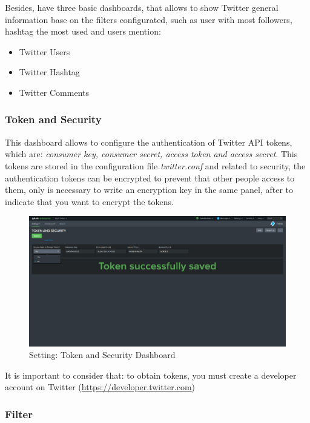 \documentclass[report]{article}
\begin{document}
Besides, have three basic dashboards, that allows to show Twitter general information base on the filters configurated, such as user with most followers, hashtag the most used and users mention: 
\newline
\begin{itemize}
\item Twitter Users
\item Twitter Hashtag
\item Twitter Comments
\newline
\end{itemize}

\subsubsection{Token and Security}
This dashboard allows to configure the authentication of Twitter API tokens, which are: \textit{consumer key, consumer secret, access token and access secret}. This tokens are stored in the configuration file \textit{twitter.conf} and related to security, the authentication tokens can be encrypted to prevent that other people access to them, only  is necessary to write an encryption key in the same panel, after to indicate that you want to encrypt the tokens. 
\newline
\begin{figure}[h!]
	\centering
	\includegraphics[scale=0.2]{img/token.png}
	\caption{\color{text}Setting: Token and Security Dashboard}
\end{figure}
\newline
It is important to consider that: to obtain tokens, you must create a developer account on Twitter (\url{https://developer.twitter.com})
\newpage
\subsubsection{Filter}
\end{document}
